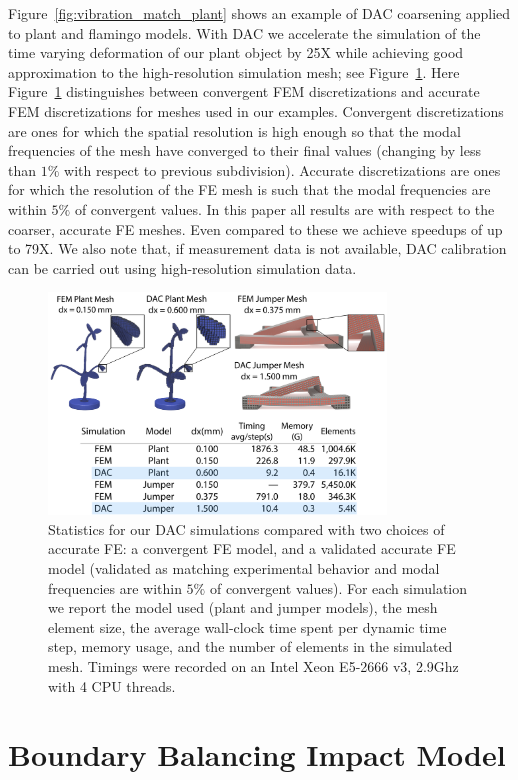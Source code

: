 Figure~\ref{fig:vibration_match_plant} shows an example of DAC coarsening applied to plant and flamingo models. With DAC we accelerate the simulation of the time varying deformation of our plant object by 25X while achieving good approximation to the high-resolution simulation mesh; see Figure~\ref{table:suff}. Here Figure~\ref{table:suff} distinguishes between convergent FEM discretizations and accurate FEM discretizations for meshes used in our examples. Convergent discretizations are ones for which the spatial resolution is high enough so that the modal frequencies of the mesh have converged to their final values (changing by less than $1\%$ with respect to previous subdivision). Accurate discretizations are ones for which the resolution of the FE mesh is such that the modal frequencies are within $5\%$ of convergent values. In this paper all results are with respect to the coarser, accurate FE meshes. Even compared to these we achieve speedups of up to 79X. We also note that, if measurement data  is not available, DAC calibration can be carried out using high-resolution simulation data.
\begin{figure}
	\includegraphics[width=0.8\textwidth]{figs/coarsening_runtime_sim}
	\centering
	\caption{Statistics for our DAC simulations compared with two choices of accurate FE: a convergent FE model, 
		and a validated accurate FE model (validated as matching experimental behavior and modal frequencies are within $5\%$ of convergent values). For each simulation we report the model used (plant and jumper models), the mesh element size,  the average wall-clock time spent per dynamic time step, memory usage, and the number of elements in the simulated mesh. Timings were recorded on an Intel Xeon E5-2666 v3, 2.9Ghz with 4 CPU threads.
	}
	\label{table:suff}
\end{figure}
\section{Boundary Balancing Impact Model}
\label{sec:BBI}

